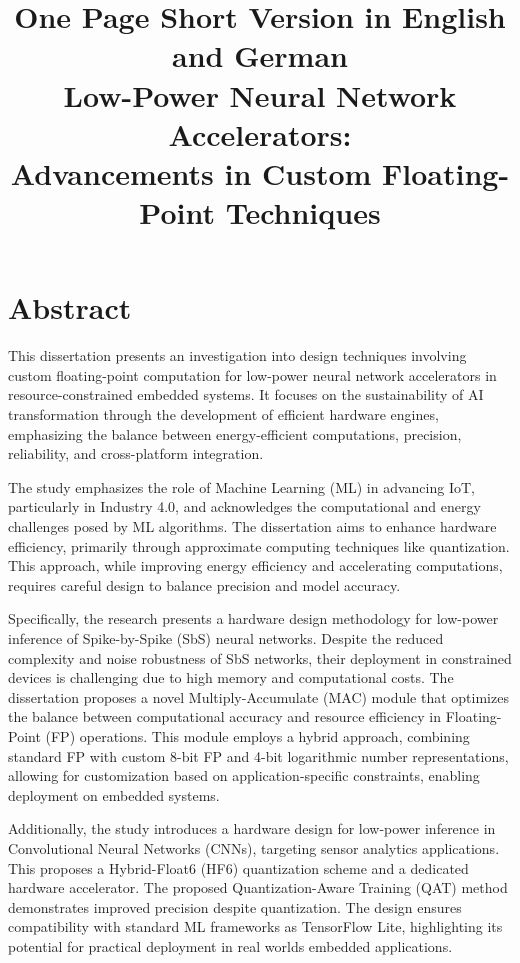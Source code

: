 \documentclass{article}
\title{One Page Short Version in English and German \\ Low-Power Neural Network Accelerators: \\ Advancements in Custom Floating-Point Techniques}
\author{}
\date{}
\begin{document}
	
	\maketitle
	
	\section*{Abstract}
	This dissertation presents an investigation into design techniques involving custom floating-point computation for low-power neural network accelerators in resource-constrained embedded systems. It focuses on the sustainability of AI transformation through the development of efficient hardware engines, emphasizing the balance between energy-efficient computations, precision, reliability, and cross-platform integration.
	
	The study emphasizes the role of Machine Learning (ML) in advancing IoT, particularly in Industry 4.0, and acknowledges the computational and energy challenges posed by ML algorithms. The dissertation aims to enhance hardware efficiency, primarily through approximate computing techniques like quantization. This approach, while improving energy efficiency and accelerating computations, requires careful design to balance precision and model accuracy.
	
	Specifically, the research presents a hardware design methodology for low-power inference of Spike-by-Spike (SbS) neural networks. Despite the reduced complexity and noise robustness of SbS networks, their deployment in constrained devices is challenging due to high memory and computational costs. The dissertation proposes a novel Multiply-Accumulate (MAC) module that optimizes the balance between computational accuracy and resource efficiency in Floating-Point (FP) operations. This module employs a hybrid approach, combining standard FP with custom 8-bit FP and 4-bit logarithmic number representations, allowing for customization based on application-specific constraints, enabling deployment on embedded systems.
	
	Additionally, the study introduces a hardware design for low-power inference in Convolutional Neural Networks (CNNs), targeting sensor analytics applications. This proposes a Hybrid-Float6 (HF6) quantization scheme and a dedicated hardware accelerator. The proposed Quantization-Aware Training (QAT) method demonstrates improved precision despite quantization. The design ensures compatibility with standard ML frameworks as TensorFlow Lite, highlighting its potential for practical deployment in real worlds embedded applications.
	
\end{document}
